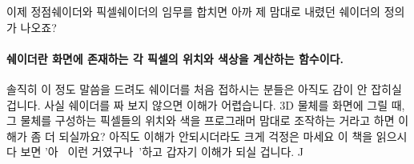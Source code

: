 이제 정점쉐이더와 픽셀쉐이더의 임무를 합치면 아까 제 맘대로 내렸던 쉐이더의 정의가 나오죠?

\paragraph{쉐이더란 화면에 존재하는 각 픽셀의 위치와 색상을 계산하는 함수이다.}


솔직히 이 정도 말씀을 드려도 쉐이더를 처음 접하시는 분들은 아직도 감이 안 잡히실 겁니다. 사실 쉐이더를 짜 보지 않으면 이해가 어렵습니다. 3D 물체를 화면에 그릴 때, 그 물체를 구성하는 픽셀들의 위치와 색을 프로그래머 맘대로 조작하는 거라고 하면 이해가 좀 더 되실까요? 아직도 이해가 안되시더라도 크게 걱정은 마세요 이 책을 읽으시다 보면 '아~ 이런 거였구나~'하고 갑자기 이해가 되실 겁니다. ^^